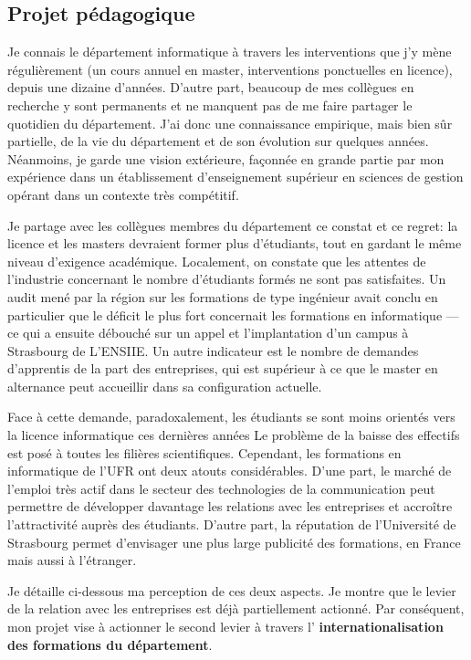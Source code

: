 \documentclass[11pt]{article}
\begin{document}
\subsection{Projet pédagogique}

Je connais le département informatique à travers les interventions que j'y mène
régulièrement (un cours annuel en master, interventions ponctuelles en licence), 
depuis une dizaine d'années. D'autre part, beaucoup de mes collègues en recherche 
y sont permanents et ne manquent pas de me faire partager le quotidien du 
département. J'ai donc une connaissance empirique, mais bien sûr partielle, de 
la vie du département et de son évolution sur quelques années. Néanmoins, je 
garde une vision extérieure, façonnée en grande partie par mon expérience 
dans un établissement d'enseignement supérieur en sciences de gestion opérant 
dans un contexte très compétitif.

Je partage avec les collègues membres du département ce constat et ce regret: 
la licence et les masters devraient former plus d'étudiants, tout en gardant le 
même niveau d'exigence académique. Localement, on constate que les attentes de 
l'industrie concernant le nombre d'étudiants formés ne sont pas satisfaites. 
Un audit mené par la région sur les formations de type ingénieur avait conclu 
en particulier que le déficit le plus fort concernait les formations en 
informatique --- ce qui a ensuite débouché sur un appel et l'implantation
d'un campus à Strasbourg de L'ENSIIE. Un autre indicateur est le nombre de
demandes d'apprentis de la part des entreprises, qui est supérieur à ce que
le master en alternance peut accueillir dans sa configuration actuelle.

Face à cette demande, paradoxalement, les étudiants se sont moins orientés 
vers la licence informatique ces dernières années  Le problème de la baisse des 
effectifs est posé à toutes les filières scientifiques. Cependant, les 
formations en informatique de l'UFR ont deux atouts considérables. D'une part, 
le marché de l'emploi très actif dans le secteur des technologies de la 
communication peut permettre de développer davantage les relations avec les 
entreprises et accroître l'attractivité auprès des étudiants. D'autre part, 
la réputation de l'Université de Strasbourg permet d'envisager une 
plus large publicité des formations, en France mais aussi à l'étranger.

Je détaille ci-dessous ma perception de ces deux aspects. Je montre que le
levier de la relation avec les entreprises est déjà partiellement actionné.
Par conséquent, mon projet vise à actionner le second levier à travers l'%
\textbf{internationalisation des formations du département}.
\end{document}
